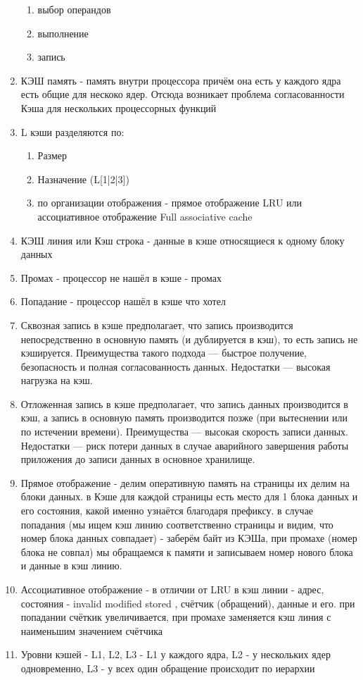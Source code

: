 \documentclass[a4paper,10pt]{article}
\begin{document}
\begin{enumerate}
\begin{enumerate}
        \item выбор операндов
        \item выполнение
        \item запись
    \end{enumerate}
    \item КЭШ память - память внутри процессора причём она есть у каждого ядра есть общие для нескоко ядер. Отсюда возникает проблема согласованности Кэша для нескольких процессорных функций
    \item L кэши разделяются по:
    \begin{enumerate}
        \item Размер
        \item Назначение (L[1|2|3])
        \item по организации отображения - прямое отображение LRU или ассоциативное отображение Full associative cache
    \end{enumerate}
    \item КЭШ линия или Кэш строка - данные в кэше относящиеся к одному блоку данных
    \item Промах - процессор не нашёл в кэше - промах
    \item Попадание - процессор нашёл в кэше что хотел
    \item Сквозная запись в кэше предполагает, что запись производится непосредственно в основную память (и дублируется в кэш), то есть запись не кэшируется. Преимущества такого подхода — быстрое получение, безопасность и полная согласованность данных. Недостатки — высокая нагрузка на кэш.
    \item Отложенная запись в кэше предполагает, что запись данных производится в кэш, а запись в основную память производится позже (при вытеснении или по истечении времени). Преимущества — высокая скорость записи данных. Недостатки — риск потери данных в случае аварийного завершения работы приложения до записи данных в основное хранилище.
    \item Прямое отображение - делим оперативную память на страницы их делим на блоки данных. в Кэше для каждой страницы есть место для 1 блока данных и его состояния, какой именно узнаётся благодаря префиксу. в случае попадания (мы ищем кэш линию соответственно страницы и видим, что номер блока данных совпадает) - заберём байт из КЭШа, при промахе (номер блока не совпал) мы обращаемся к памяти и записываем номер нового блока и данные в кэш линию.
    \item Ассоциативное отображение - в отличии от LRU в кэш линии - адрес, состояния - invalid modified stored , счётчик (обращений), данные и его. при попадании счёткик увеличивается, при промахе заменяется кэш линия с наименьшим значением счётчика
    \item Уровни кэшей - L1, L2, L3 - L1 у каждого ядра, L2 - у нескольких ядер одновременно, L3 - у всех один обращение происходит по иерархии
\end{enumerate}
\end{document}
